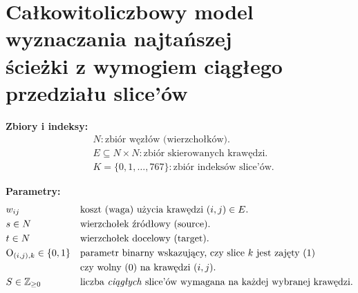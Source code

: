 \documentclass[12pt]{article}
\begin{document}
\section*{Całkowitoliczbowy model wyznaczania najtańszej \\ ścieżki z wymogiem ciągłego przedziału slice'ów}

\noindent \textbf{Zbiory i indeksy:}
\begin{align*}
	 & N: \text{zbiór węzłów (wierzchołków).}                      \\
	 & E \subseteq N \times N: \text{zbiór skierowanych krawędzi.} \\
	 & K = \{0,1,\dots,767\}: \text{zbiór indeksów slice'ów.}
\end{align*}

\vspace{1em}

\noindent \textbf{Parametry:}
\begin{align*}
	 & w_{ij}
	 &                                & \text{koszt (waga) użycia krawędzi }(i,j)\in E.                                                                                  \\
	 & s \in N
	 &                                & \text{wierzchołek źródłowy (source).}                                                                                            \\
	 & t \in N
	 &                                & \text{wierzchołek docelowy (target).}                                                                                            \\
	 & \text{O}_{(i,j),k} \in \{0,1\}
	 &                                & \text{parametr binarny wskazujący, czy slice }k \text{ jest zajęty (}1\text{) }                                                  \\
	 &                                &                                                                                 & \text{czy wolny (}0\text{) na krawędzi }(i,j). \\
	 & S \in \mathbb{Z}_{\ge 0}
	 &                                & \text{liczba \emph{ciągłych} slice'ów wymagana na każdej wybranej krawędzi.}
\end{align*}

\vspace{1em}
\end{document}

